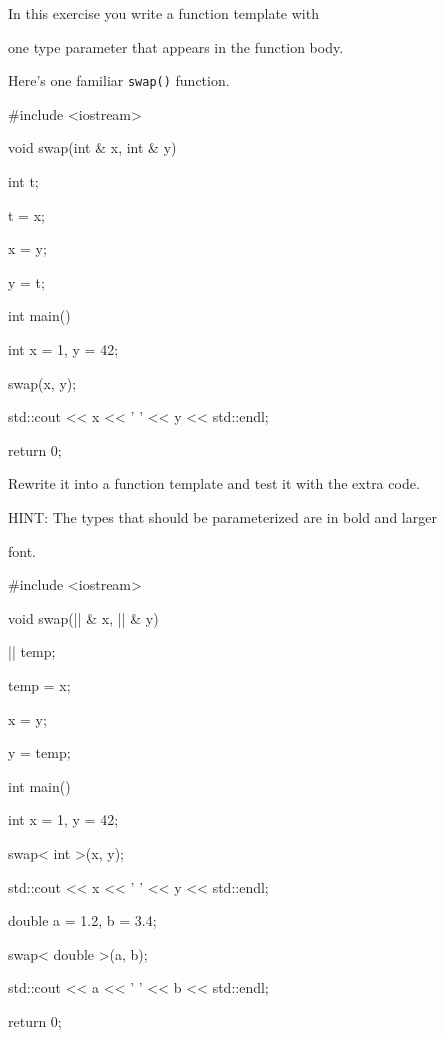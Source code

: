 In this exercise you write a function template with

one type parameter that appears in the function body.

Here's one familiar \texttt{swap()} function.



\begin{consolethree}[escapeinside=||]

#include <iostream>



void swap(int & x, int & y)

{

    int t;

    t = x;

    x = y;

    y = t;

}



int main()

{

    int x = 1, y = 42;

    swap(x, y);

    std::cout << x << ' ' << y << std::endl;

    return 0;

}

\end{consolethree}



Rewrite it into a function template and test it with the extra code.

HINT: The types that should be parameterized are in bold and larger

font.



\begin{consolethree}[escapeinside=||]

#include <iostream>



void swap(|| & x, || & y)

{

    || temp;

    temp = x;

    x = y;

    y = temp;

}



int main()

{

    int x = 1, y = 42;

    swap< int >(x, y);

    std::cout << x << ' ' << y << std::endl;



    double a = 1.2, b = 3.4;

    swap< double >(a, b);

    std::cout << a << ' ' << b << std::endl;

    return 0;

}

\end{consolethree}

